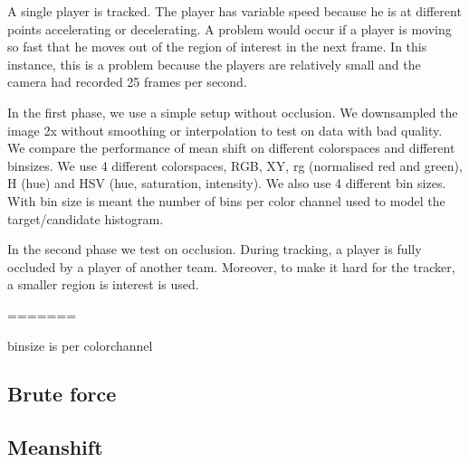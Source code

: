\documentclass[a4paper,11pt]{article}
\begin{document}
	A single player is tracked. The player has variable speed because he is at
	different points accelerating or decelerating. A problem would occur if a
	player is moving so fast that he moves out of the region of interest in the
	next frame. In this instance, this is a problem because the players are
	relatively small and the camera had recorded 25 frames per second.
	
	In the first phase, we use a simple setup without occlusion. We downsampled
	the image 2x without smoothing or interpolation to test on data with bad
	quality.  We compare the performance of mean shift on different colorspaces
	and different binsizes.  We use 4 different colorspaces, RGB, XY, rg
	(normalised red and green), H (hue) and HSV (hue, saturation, intensity). We
	also use 4 different bin sizes. With bin size is meant the number of bins
	per color channel used to model the target/candidate histogram.

	In the second phase we test on occlusion. During tracking, a player is fully
	occluded by a player of another team. Moreover, to make it hard for the
	tracker, a smaller region is interest is used. 




=======

	binsize is per colorchannel

	\subsection{Brute force} 

	\subsection{Meanshift} 
\end{document}
